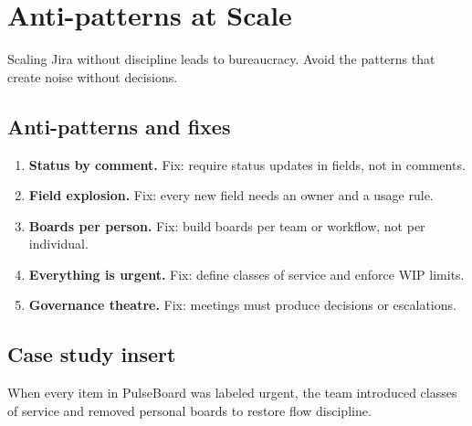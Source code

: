 \section{Anti-patterns at Scale}
Scaling Jira without discipline leads to bureaucracy. Avoid the patterns that create noise without decisions.

\subsection{Anti-patterns and fixes}
\begin{enumerate}
  \item \textbf{Status by comment.} Fix: require status updates in fields, not in comments.
  \item \textbf{Field explosion.} Fix: every new field needs an owner and a usage rule.
  \item \textbf{Boards per person.} Fix: build boards per team or workflow, not per individual.
  \item \textbf{Everything is urgent.} Fix: define classes of service and enforce WIP limits.
  \item \textbf{Governance theatre.} Fix: meetings must produce decisions or escalations.
\end{enumerate}

\subsection{Case study insert}
When every item in PulseBoard was labeled urgent, the team introduced classes of service and removed personal boards to restore flow discipline.







